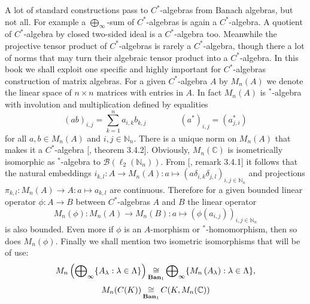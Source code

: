 A lot of standard constructions pass to $C^*$-algebras from Banach algebras, but
not all. For example a $\bigoplus_\infty$-sum of $C^*$-algebras is again a
$C^*$-algebra. A quotient of $C^*$-algebra by closed two-sided ideal is a
$C^*$-algebra too. Meanwhile the projective tensor product of $C^*$-algebras is
rarely a $C^*$-algebra, though there a lot of norms that may turn their
algebraic tensor product into a $C^*$-algebra. In this book we shall exploit one
specific and highly important for $C^*$-algebras construction of matrix
algebras. For a given $C^*$-algebra $A$ by $M_n(A)$ we denote the linear space
of $n\times n$ matrices with entries in $A$. In fact $M_n(A)$ is ${}^*$-algebra
with involution and multiplication defined by equalities 
$$
{(ab)}_{i,j}=\sum_{k=1}^n a_{i,k}b_{k,j}
\qquad\qquad
{(a^*)}_{i,j}=(a_{j,i}^*)
$$ 
for all $a,b\in M_n(A)$ and $i,j\in\mathbb{N}_n$. There is a unique norm on
$M_n(A)$ that makes it a $C^*$-algebra [\cite{MurphyCStarAlgsAndOpTh}, theorem
3.4.2]. Obviously, $M_n(\mathbb{C})$ is isometrically isomorphic as
${}^*$-algebra to $\mathcal{B}(\ell_2(\mathbb{N}_n))$. From
[\cite{MurphyCStarAlgsAndOpTh}, remark 3.4.1] it follows that the natural
embeddings 
$i_{k,l}:A\to M_n(A):a\mapsto{(a\delta_{i,k}\delta_{j,l})}_{i,j\in\mathbb{N}_n}$
and projections
$\pi_{k,l}:M_n(A)\to A:a\mapsto a_{k,l}$ are continuous. Therefore for a given
bounded linear operator $\phi:A\to B$ between $C^*$-algebras $A$ and $B$ the
linear operator 
$$
M_n(\phi):M_n(A)\to M_n(B):a\mapsto {(\phi(a_{i,j}))}_{i,j\in\mathbb{N}_n}
$$ 
is also bounded. Even more if $\phi$ is an $A$-morphism or ${}^*$-homomorphism,
then so does $M_n(\phi)$. Finally we shall mention two isometric isomorphisms
that will be of use:
$$
M_n\left(\bigoplus\nolimits_\infty \{A_\lambda:\lambda\in\Lambda \}\right)
\mathop{\mathbin{\cong}}\limits_{\mathbf{Ban}_1}
\bigoplus\nolimits_\infty \{M_n\left(A_\lambda\right):\lambda\in\Lambda \},
$$
$$
M_n(C(K))\mathop{\mathbin{\cong}}\limits_{\mathbf{Ban}_1}C(K,M_n(\mathbb{C}))
$$

